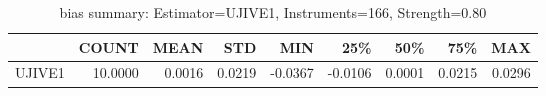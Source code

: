 \begin{table}[ht]
\centering
\caption{bias summary: Estimator=UJIVE1, Instruments=166, Strength=0.80}
\begin{tabular}{lrrrrrrrr}
\toprule
 & COUNT & MEAN & STD & MIN & 25\% & 50\% & 75\% & MAX \\
\midrule
UJIVE1 & 10.0000 & 0.0016 & 0.0219 & -0.0367 & -0.0106 & 0.0001 & 0.0215 & 0.0296 \\
\bottomrule
\end{tabular}
\end{table}
